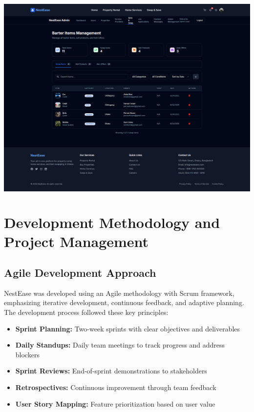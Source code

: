 \documentclass[conference]{IEEEtran}
\begin{document}
\begin{center}
\noindent
\begin{minipage}[t]{0.45\textwidth}
\includegraphics[width=\linewidth]{Project Screenshot/Admin Swap & Save.png}
\end{minipage}

\end{center}





\section{Development Methodology and Project Management}
\subsection{Agile Development Approach}
NestEase was developed using an Agile methodology with Scrum framework, emphasizing iterative development, continuous feedback, and adaptive planning. The development process followed these key principles:

\begin{itemize}
    \item \textbf{Sprint Planning:} Two-week sprints with clear objectives and deliverables
    \item \textbf{Daily Standups:} Daily team meetings to track progress and address blockers
    \item \textbf{Sprint Reviews:} End-of-sprint demonstrations to stakeholders
    \item \textbf{Retrospectives:} Continuous improvement through team feedback
    \item \textbf{User Story Mapping:} Feature prioritization based on user value
\end{itemize}
\end{document}

